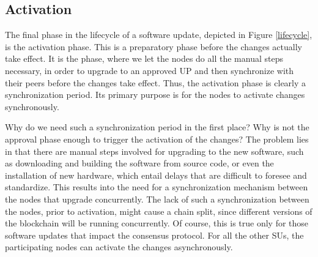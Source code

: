 \subsection{Activation}\label{se:activation}

The final phase in the lifecycle of a software update, depicted in Figure \ref{lifecycle}, is the activation phase. This is a preparatory phase before the changes actually take effect. It is the phase, where we let the nodes do all the manual steps necessary, in order to upgrade to an approved UP and then synchronize with their peers before the changes take effect.
 Thus, the activation phase is clearly a synchronization period. Its primary purpose is for the nodes to activate changes synchronously.

Why do we need such a synchronization period in the first place? Why is not the approval phase enough to trigger the activation of the changes? The problem lies in that there are manual steps involved for upgrading to the new software, such as downloading and building the software from source code, or even the installation of new hardware, which entail delays that are difficult to foresee and standardize. This results into the need for a synchronization mechanism between the nodes that upgrade concurrently. The lack of such a synchronization between the nodes, prior to activation, might cause a chain split, since different versions of the blockchain will be running concurrently. Of course, this is true only for those software updates that impact the consensus protocol. For all the other SUs, the participating nodes can activate the changes asynchronously. %


